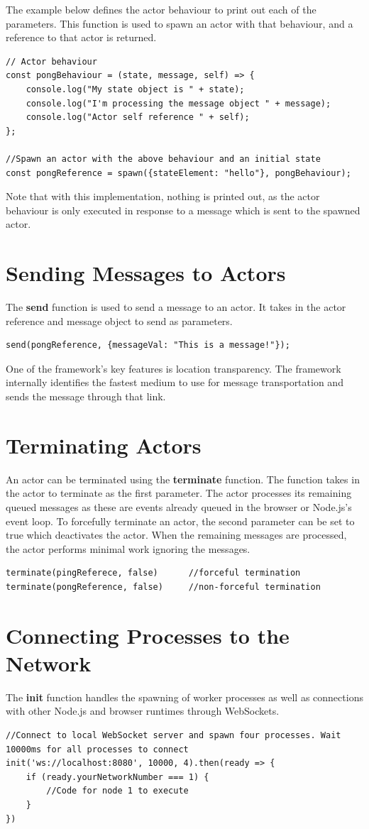 \documentclass[oneside]{um-fict}
\begin{document}
The example below defines the actor behaviour to print out each of the parameters. This function is used to spawn an actor with that behaviour, and a reference to that actor is returned.
\newpage
\begin{lstlisting}
// Actor behaviour
const pongBehaviour = (state, message, self) => {
    console.log("My state object is " + state);
    console.log("I'm processing the message object " + message);
    console.log("Actor self reference " + self);
};

//Spawn an actor with the above behaviour and an initial state
const pongReference = spawn({stateElement: "hello"}, pongBehaviour);
\end{lstlisting}
Note that with this implementation, nothing is printed out, as the actor behaviour is only executed in response to a message which is sent to the spawned actor.
\section{Sending Messages to Actors}
The \textbf{send} function is used to send a message to an actor. It takes in the actor reference and message object to send as parameters.
\begin{lstlisting}
send(pongReference, {messageVal: "This is a message!"});
\end{lstlisting}
One of the framework's key features is location transparency. The framework internally identifies the fastest medium to use for message transportation and sends the message through that link.
\section{Terminating Actors}
An actor can be terminated using the \textbf{terminate} function. The function takes in the actor to terminate as the first parameter. The actor processes its remaining queued messages as these are events already queued in the browser or Node.js's event loop. To forcefully terminate an actor, the second parameter can be set to true which deactivates the actor. When the remaining messages are processed, the actor performs minimal work ignoring the messages.
\begin{lstlisting}
terminate(pingReferece, false)      //forceful termination
terminate(pongReference, false)     //non-forceful termination
\end{lstlisting}
\section{Connecting Processes to the Network}
The \textbf{init} function handles the spawning of worker processes as well as connections with other Node.js and browser runtimes through WebSockets.
\begin{lstlisting}
//Connect to local WebSocket server and spawn four processes. Wait 10000ms for all processes to connect
init('ws://localhost:8080', 10000, 4).then(ready => {
    if (ready.yourNetworkNumber === 1) {
        //Code for node 1 to execute
    }
})
\end{lstlisting}
 
\end{document}
